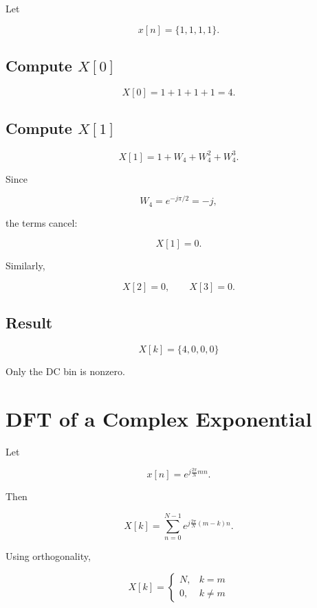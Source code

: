 Let

\[
x[n]=\{1,1,1,1\}.
\]


\subsection{Compute \(X[0]\)}

\[
X[0]=1+1+1+1=4.
\]


\subsection{Compute \(X[1]\)}

\[
X[1]=1+W_4+W_4^2+W_4^3.
\]

Since

\[
W_4=e^{-j\pi/2}=-j,
\]

the terms cancel:

\[
X[1]=0.
\]

Similarly,

\[
X[2]=0,\qquad X[3]=0.
\]


\subsection{Result}

\[
\boxed{
X[k]=\{4,0,0,0\}
}
\]

Only the DC bin is nonzero.


\section{DFT of a Complex Exponential}

Let

\[
x[n]=e^{j\frac{2\pi}{N}mn}.
\]

Then

\[
X[k]=
\sum_{n=0}^{N-1}
e^{j\frac{2\pi}{N}(m-k)n}.
\]

Using orthogonality,

\[
\boxed{
X[k]=
\begin{cases}
N, & k=m\\
0, & k\neq m
\end{cases}
}
\]

